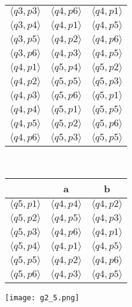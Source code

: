 \documentclass{article}
\begin{document}
\begin{enumerate}
\begin{tabular}{|c|c|c|}
         $\langle q3,p3 \rangle$    & $\langle q4,p6 \rangle$   & $\langle q4,p1 \rangle$    \\
         $\langle q3,p4 \rangle$    & $\langle q4,p1 \rangle$   & $\langle q4,p5 \rangle$    \\ 
         $\langle q3,p5 \rangle$    & $\langle q4,p2 \rangle$   & $\langle q4,p6 \rangle$    \\
         $\langle q3,p6 \rangle$    & $\langle q4,p3 \rangle$   & $\langle q4,p5 \rangle$    \\  \hline
         $\langle q4,p1 \rangle$    & $\langle q5,p4 \rangle$   & $\langle q5,p2 \rangle$    \\
         $\langle q4,p2 \rangle$    & $\langle q5,p5 \rangle$   & $\langle q5,p3 \rangle$    \\ 
         $\langle q4,p3 \rangle$    & $\langle q5,p6 \rangle$   & $\langle q5,p1 \rangle$    \\
         $\langle q4,p4 \rangle$    & $\langle q5,p1 \rangle$   & $\langle q5,p5 \rangle$    \\ 
         $\langle q4,p5 \rangle$    & $\langle q5,p2 \rangle$   & $\langle q5,p6 \rangle$    \\
         $\langle q4,p6 \rangle$    & $\langle q5,p3 \rangle$   & $\langle q5,p5 \rangle$    \\  \hline
    \end{tabular} \
    \begin{tabular}{|c|c|c|}
        \hline
                              & a                         & b     \\ \hline
         $\langle q5,p1 \rangle$    & $\langle q4,p4 \rangle$   & $\langle q4,p2 \rangle$    \\
         $\langle q5,p2 \rangle$    & $\langle q4,p5 \rangle$   & $\langle q4,p3 \rangle$    \\ 
         $\langle q5,p3 \rangle$    & $\langle q4,p6 \rangle$   & $\langle q4,p1 \rangle$    \\
         $\langle q5,p4 \rangle$    & $\langle q4,p1 \rangle$   & $\langle q4,p5 \rangle$    \\ 
         $\langle q5,p5 \rangle$    & $\langle q4,p2 \rangle$   & $\langle q4,p6 \rangle$    \\
         $\langle q5,p6 \rangle$    & $\langle q4,p3 \rangle$   & $\langle q4,p5 \rangle$    \\  \hline
    \end{tabular}
    \begin{flushleft}
        \texttt{[image: g2\_5.png]}
    \end{flushleft}
\end{enumerate}
\end{document}
